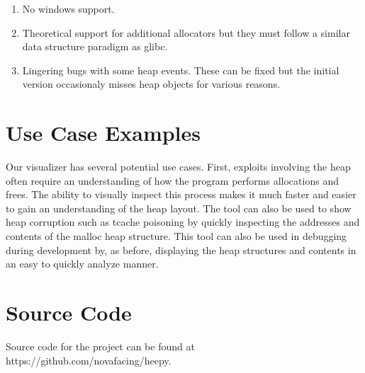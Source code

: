 \documentclass[12pt]{article}
\begin{document}
\begin{enumerate}
    \item No windows support. \\
    \item Theoretical support for additional allocators but they must follow a similar data structure paradigm as glibc. \\
    \item Lingering bugs with some heap events. These can be fixed but the initial version occasionaly misses heap objects for various reasons. \\
\end{enumerate}

\section{Use Case Examples}

Our visualizer has several potential use cases. First, exploits involving the heap often require an understanding of how the program performs allocations and frees. The ability to visually inspect this process makes it much faster and easier to gain an understanding of the heap layout. The tool can also be used to show heap corruption such as tcache poisoning by quickly inspecting the addresses and contents of the malloc heap structure. This tool can also be used in debugging during development by, as before, displaying the heap structures and contents in an easy to quickly analyze manner. \\

\section{Source Code}

Source code for the project can be found at https://github.com/novafacing/heepy.
\end{document}
